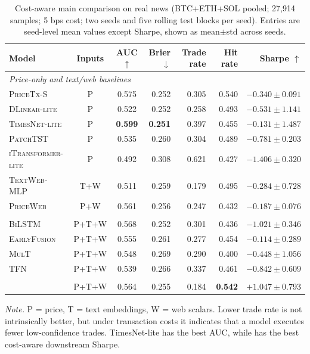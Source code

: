 \begin{table}[t]
\caption{Cost-aware main comparison on \dataset{} real news (BTC+ETH+SOL pooled; 27{,}914 samples; 5 bps cost; two seeds and five rolling test blocks per seed). Entries are seed-level mean values except Sharpe, shown as mean$\pm$std across seeds.}
\label{tab:main}
\centering
\footnotesize
\setlength{\tabcolsep}{4pt}
\renewcommand{\arraystretch}{1.08}
\begin{tabular}{lccrrrr}
\toprule
Model & Inputs & AUC $\uparrow$ & Brier $\downarrow$ & Trade rate & Hit rate & Sharpe $\uparrow$ \\
\midrule
\multicolumn{7}{l}{\emph{Price-only and text/web baselines}} \\
\textsc{PriceTx-S} & P & 0.575 & 0.252 & 0.305 & 0.540 & $-0.340{\pm}0.091$ \\
\textsc{DLinear-lite} & P & 0.522 & 0.252 & 0.258 & 0.493 & $-0.531{\pm}1.141$ \\
\textsc{TimesNet-lite} & P & \textbf{0.599} & \textbf{0.251} & 0.397 & 0.455 & $-0.131{\pm}1.487$ \\
\textsc{PatchTST} & P & 0.535 & 0.260 & 0.304 & 0.489 & $-0.781{\pm}0.203$ \\
\textsc{iTransformer-lite} & P & 0.492 & 0.308 & 0.621 & 0.427 & $-1.406{\pm}0.320$ \\
\textsc{TextWeb-MLP} & T+W & 0.511 & 0.259 & 0.179 & 0.495 & $-0.284{\pm}0.728$ \\
\textsc{PriceWeb} & P+W & 0.561 & 0.256 & 0.247 & 0.432 & $-0.187{\pm}0.076$ \\
\addlinespace[2pt]
\midrule
\multicolumn{7}{l}{\emph{Multimodal baselines}} \\
\textsc{BiLSTM} & P+T+W & 0.568 & 0.252 & 0.301 & 0.436 & $-1.021{\pm}0.346$ \\
\textsc{EarlyFusion} & P+T+W & 0.555 & 0.261 & 0.277 & 0.454 & $-0.114{\pm}0.289$ \\
\textsc{MulT} & P+T+W & 0.548 & 0.269 & 0.290 & 0.400 & $-0.448{\pm}1.056$ \\
\textsc{TFN} & P+T+W & 0.539 & 0.266 & 0.337 & 0.461 & $-0.842{\pm}0.609$ \\
\addlinespace[2pt]
\midrule
\multicolumn{7}{l}{\emph{Proposed}} \\
\CGCMA{} & P+T+W & 0.564 & 0.255 & 0.184 & \textbf{0.542} & \textbf{$+1.047{\pm}0.793$} \\
\bottomrule
\end{tabular}
\vspace{2pt}
\parbox{0.92\textwidth}{\footnotesize \emph{Note.} P = price, T = text embeddings, W = web scalars. Lower trade rate is not intrinsically better, but under transaction costs it indicates that a model executes fewer low-confidence trades. TimesNet-lite has the best AUC, while \CGCMA{} has the best cost-aware downstream Sharpe.}
\end{table}

